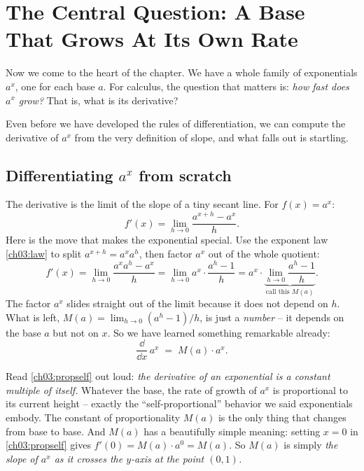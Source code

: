 \section{The Central Question: A Base That Grows At Its Own Rate}

Now we come to the heart of the chapter. We have a whole family of exponentials $a^x$, one for each base $a$. For calculus, the question that matters is: \emph{how fast does $a^x$ grow?} That is, what is its derivative?

Even before we have developed the rules of differentiation, we can compute the derivative of $a^x$ from the very definition of slope, and what falls out is startling.

\subsection{Differentiating $a^x$ from scratch}

The derivative is the limit of the slope of a tiny secant line. For $f(x)=a^x$:
\[
f'(x) = \lim_{h\to 0} \frac{a^{x+h}-a^{x}}{h}.
\]
Here is the move that makes the exponential special. Use the exponent law \eqref{ch03:law} to split $a^{x+h}=a^x a^h$, then factor $a^x$ out of the whole quotient:
\[
f'(x) = \lim_{h\to 0}\frac{a^{x}a^{h}-a^{x}}{h}
       = \lim_{h\to 0} a^{x}\cdot\frac{a^{h}-1}{h}
       = a^{x}\cdot \underbrace{\lim_{h\to 0}\frac{a^{h}-1}{h}}_{\text{call this } M(a)}.
\]
The factor $a^x$ slides straight out of the limit because it does not depend on $h$. What is left, $M(a)=\lim_{h\to0}(a^h-1)/h$, is just a \emph{number} -- it depends on the base $a$ but not on $x$. So we have learned something remarkable already:
\begin{equation}
\frac{\dd}{\dd x}\,a^{x} \;=\; M(a)\cdot a^{x}. \label{ch03:propself}
\end{equation}

\begin{intuitionbox}
Read \eqref{ch03:propself} out loud: \emph{the derivative of an exponential is a constant multiple of itself.} Whatever the base, the rate of growth of $a^x$ is proportional to its current height -- exactly the ``self-proportional'' behavior we said exponentials embody. The constant of proportionality $M(a)$ is the only thing that changes from base to base. And $M(a)$ has a beautifully simple meaning: setting $x=0$ in \eqref{ch03:propself} gives $f'(0)=M(a)\cdot a^0 = M(a)$. So $M(a)$ is simply \emph{the slope of $a^x$ as it crosses the $y$-axis at the point $(0,1)$.}
\end{intuitionbox}


